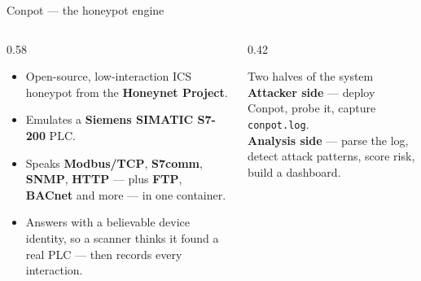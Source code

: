 \documentclass[aspectratio=169,11pt]{beamer}
\begin{document}
\begin{frame}{Conpot --- the honeypot engine}
  \begin{columns}[T]
    \begin{column}{0.58\textwidth}
      \begin{itemize}
        \item Open-source, low-interaction ICS honeypot from the \textbf{Honeynet Project}.
        \item Emulates a \textbf{Siemens SIMATIC S7-200} PLC.
        \item Speaks \textbf{Modbus/TCP}, \textbf{S7comm}, \textbf{SNMP}, \textbf{HTTP} ---
              plus \textbf{FTP}, \textbf{BACnet} and more --- in one container.
        \item Answers with a believable device identity, so a scanner thinks it found a
              real PLC --- then records every interaction.
      \end{itemize}
    \end{column}
    \begin{column}{0.42\textwidth}
      \begin{block}{Two halves of the system}
        \textbf{Attacker side} --- deploy Conpot, probe it, capture \texttt{conpot.log}.\\[4pt]
        \textbf{Analysis side} --- parse the log, detect attack patterns, score risk, build a
        dashboard.
      \end{block}
    \end{column}
  \end{columns}
\end{frame}

\end{document}
